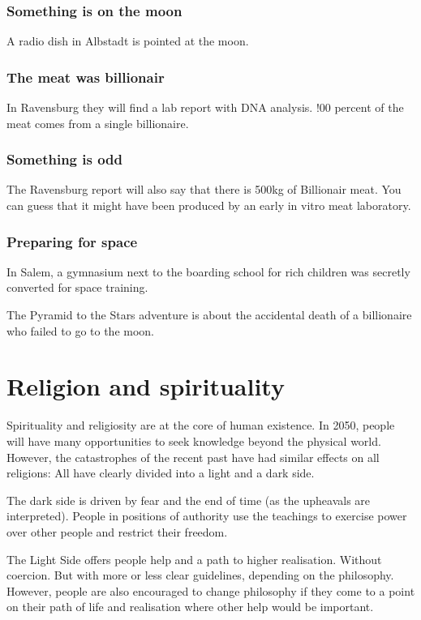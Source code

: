 \subsubsection{Something is on the moon}

A radio dish in Albstadt is pointed at the moon.

\subsubsection{The meat was billionair}

In Ravensburg they will find a lab report with DNA analysis. !00 percent of the meat comes from a single billionaire.

\subsubsection{Something is odd}

The Ravensburg report will also say that there is 500kg of Billionair meat. You can guess that it might have been produced by an early in vitro meat laboratory.

\subsubsection{Preparing for space}

In Salem, a gymnasium next to the boarding school for rich children was secretly converted for space training.

The Pyramid to the Stars adventure is about the accidental death of a billionaire who failed to go to the moon.


\section{Religion and spirituality}

Spirituality and religiosity are at the core of human existence. In 2050, people will have many opportunities to seek knowledge beyond the physical world.
However, the catastrophes of the recent past have had similar effects on all religions: All have clearly divided into a light and a dark side.

The dark side is driven by fear and the end of time (as the upheavals are interpreted). People in positions of authority use the teachings to exercise power over other people and restrict their freedom.

The Light Side offers people help and a path to higher realisation. Without coercion. But with more or less clear guidelines, depending on the philosophy. However, people are also encouraged to change philosophy if they come to a point on their path of life and realisation where other help would be important.

